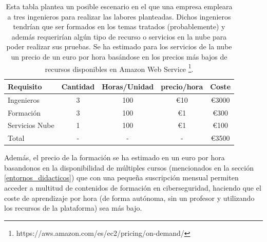 \begin{table}[hbt]
\begin{tabular}{|l|cccc|}
\hline
Requisito    & Cantidad & Horas/Unidad & precio/hora & Coste \\
\hline
Ingenieros   & 3      & 100             & \euro{10} & \euro{3000} \\
Formación    & 3      & 100             & \euro{1}          & \euro{300} \\
Servicios Nube & 1      & 100             & \euro{1  }         & \euro{100} \\
\hline
Total        & -      & -               & -           & \euro{3500} \\
\hline
\end{tabular}
\caption{Esta tabla plantea un posible escenario en el que una empresa empleara a tres ingenieros para realizar las labores planteadas. Dichos ingenieros tendrían que ser formados en los temas tratados (probablemente) y además requerirían algún tipo de recurso o servicios en la nube para poder realizar sus pruebas. Se ha estimado para los servicios de la nube un precio de un euro por hora basándose en los precios más bajos de recursos disponibles en Amazon Web Service \footnote{https://aws.amazon.com/es/ec2/pricing/on-demand/}.} Además, el precio de la formación se ha estimado en un euro por hora basandonos en la disponibilidad de múltiples cursos (mencionados en la sección \ref{entornos_didacticos}) que con una pequeña suscripción mensual permiten acceder a multitud de contenidos de formación en ciberseguridad, haciendo que el coste de aprendizaje por hora (de forma autónoma, sin un profesor y utilizando los recursos de la plataforma) sea más bajo.
\label{tab:my-table}
\end{table}


\bigskip
